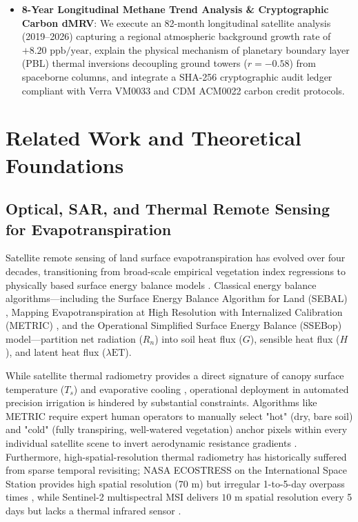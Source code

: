 \documentclass[sn-mathphys-num,Numbered]{sn-jnl}
\begin{document}
\begin{itemize}
    \item \textbf{8-Year Longitudinal Methane Trend Analysis \& Cryptographic Carbon dMRV}: We execute an 82-month longitudinal satellite analysis (2019--2026) capturing a regional atmospheric background growth rate of $+8.20\text{ ppb/year}$, explain the physical mechanism of planetary boundary layer (PBL) thermal inversions decoupling ground towers ($r = -0.58$) from spaceborne columns, and integrate a SHA-256 cryptographic audit ledger compliant with Verra VM0033 and CDM ACM0022 carbon credit protocols.
\end{itemize}

\section{Related Work and Theoretical Foundations}\label{sec:related_work}

\subsection{Optical, SAR, and Thermal Remote Sensing for Evapotranspiration}\label{sec:related_et_rs}
Satellite remote sensing of land surface evapotranspiration has evolved over four decades, transitioning from broad-scale empirical vegetation index regressions to physically based surface energy balance models \cite{Bastiaanssen1998,Allen2007,Cleugh2007,Mu2011,Zhang2016}. Classical energy balance algorithms—including the Surface Energy Balance Algorithm for Land (SEBAL) \cite{Bastiaanssen1998}, Mapping Evapotranspiration at High Resolution with Internalized Calibration (METRIC) \cite{Allen2007}, and the Operational Simplified Surface Energy Balance (SSEBop) model—partition net radiation ($R_n$) into soil heat flux ($G$), sensible heat flux ($H$), and latent heat flux ($\lambda \mathrm{ET}$). 

While satellite thermal radiometry provides a direct signature of canopy surface temperature ($T_s$) and evaporative cooling \cite{Li2022,Anderson2012,Fisher2017}, operational deployment in automated precision irrigation is hindered by substantial constraints. Algorithms like METRIC require expert human operators to manually select "hot" (dry, bare soil) and "cold" (fully transpiring, well-watered vegetation) anchor pixels within every individual satellite scene to invert aerodynamic resistance gradients \cite{Allen2007}. Furthermore, high-spatial-resolution thermal radiometry has historically suffered from sparse temporal revisiting; NASA ECOSTRESS on the International Space Station provides high spatial resolution ($70\text{ m}$) but irregular 1-to-5-day overpass times \cite{Fisher2017}, while Sentinel-2 multispectral MSI delivers $10\text{ m}$ spatial resolution every 5 days but lacks a thermal infrared sensor \cite{Drusch2012,Roy2014}. 
\end{document}
